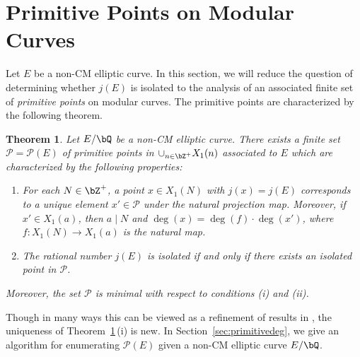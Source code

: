\documentclass[11pt,reqno]{amsart}
\theoremstyle{plain}
\newtheorem{theorem}{Theorem}%
\theoremstyle{definition}
\newcommand{\Q}{\bQ}
\newcommand{\Z}{\bZ}
\newcommand{\abbey}[1]{\textcolor{blue}{Abbey: #1}}
\newcommand{\abedit}[1]{{\color{blue} #1}}
\begin{document}
  
\section{Primitive Points on Modular Curves}
\label{sec:PrimitivePoints}

Let $E$ be a non-CM elliptic curve. In this section, we will reduce the question of determining whether $j(E)$ is isolated to the analysis of an associated finite set of \emph{primitive points} on modular curves. The primitive points are characterized by the following theorem.

\begin{theorem}\label{Thm:PrimPts}
Let $E/\Q$ be a non-CM elliptic curve.  There exists a finite set $\mathcal{P}=\mathcal{P}(E)$ of primitive points in $\cup_{n \in \Z^+} X_1(n)$ associated to $E$ which are characterized by the following properties:
\begin{enumerate}
\item For each $N\in \Z^+$, a point $x \in X_1(N)$ with $j(x)=j(E)$ corresponds to a unique element $x' \in \mathcal{P}$ under the natural projection map. Moreover, if $x' \in X_1(a)$, then $a \mid N$ and $\deg(x)=\deg(f)\cdot \deg(x')$, where $f\colon X_1(N) \rightarrow X_1(a)$ is the natural map.
\item The rational number $j(E)$ is isolated if and only if there exists an isolated point in $\mathcal{P}$.
\end{enumerate}
Moreover, the set $\mathcal{P}$ is minimal with respect to conditions (i) and (ii).
\end{theorem} 

\noindent Though in many ways this can be viewed as a refinement of results in \cite{BELOV}, the uniqueness of Theorem~\ref{Thm:PrimPts}\,(i) is new. In Section~\ref{sec:primitivedeg}, we give an algorithm for enumerating $\mathcal{P}(E)$ given a non-CM elliptic curve $E/\Q$.


\end{document}

